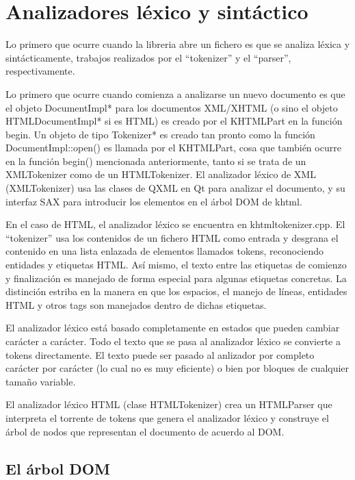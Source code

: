 \section{Analizadores léxico y sintáctico}\label{tokenizerandparser}

Lo primero que ocurre cuando la libreria abre un fichero es que se analiza léxica y sintácticamente, trabajos realizados por el ``tokenizer'' y el ``parser'', respectivamente.

Lo primero que ocurre cuando comienza a analizarse un nuevo documento es que el objeto DocumentImpl* para los documentos XML/XHTML (o sino el objeto HTMLDocumentImpl* si es HTML) es creado por el KHTMLPart en la función begin. Un objeto de tipo Tokenizer* es creado tan pronto como la función DocumentImpl::open() es llamada por el KHTMLPart, cosa que también ocurre en la función begin() mencionada anteriormente, tanto si se trata de un XMLTokenizer como de un HTMLTokenizer. El analizador léxico de XML (XMLTokenizer) usa las clases de QXML en Qt para analizar el documento, y su interfaz SAX para introducir los elementos en el árbol DOM de khtml.

En el caso de HTML, el analizador léxico se encuentra en khtmltokenizer.cpp. El ``tokenizer'' usa los contenidos de un fichero HTML como entrada y desgrana el contenido  en una lista enlazada de elementos llamados tokens, reconociendo entidades y etiquetas HTML. Así mismo, el texto entre las etiquetas de comienzo y finalización es manejado de forma especial para algunas etiquetas concretas. La distinción estriba en la manera en que los espacios, el manejo de líneas, entidades HTML y otros tags son manejados dentro de dichas etiquetas.

El analizador léxico está basado completamente en estados que pueden cambiar carácter a carácter. Todo el texto que se pasa al analizador léxico se convierte a tokens directamente. El texto puede ser pasado al anlizador por completo carácter por carácter (lo cual no es muy eficiente) o bien por bloques de cualquier tamaño variable.

El analizador léxico HTML (clase HTMLTokenizer) crea un HTMLParser que interpreta el torrente de tokens que genera el analizador léxico y construye el árbol de nodos que representan el documento de acuerdo al DOM.

\subsection{El árbol DOM}\label{khtml_dom}

